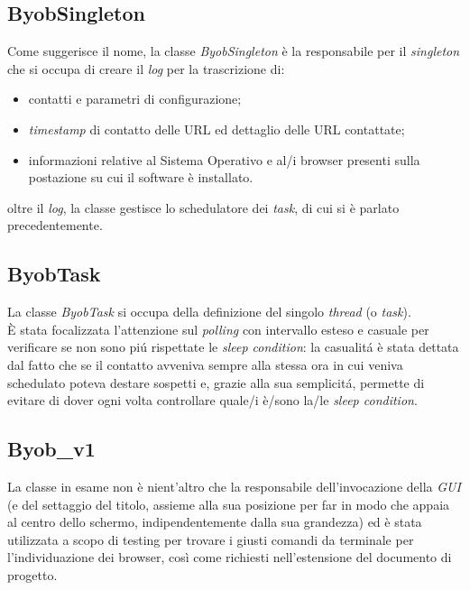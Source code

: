 \vspace*{0.5cm}
\subsection{ByobSingleton}
Come suggerisce il nome, la classe \textit{ByobSingleton} \`e la responsabile per il \textit{singleton} che si occupa di creare il \textit{log} per la trascrizione di:
\begin{itemize}
\item contatti e parametri di configurazione;
\item \textit{timestamp} di contatto delle URL ed dettaglio delle URL contattate;
\item informazioni relative al Sistema Operativo e al/i browser presenti sulla postazione su cui il software \`e installato.
\end{itemize}
oltre il \textit{log}, la classe gestisce lo schedulatore dei \textit{task}, di cui si \`e parlato precedentemente.

\vspace*{0.5cm}
\subsection{ByobTask}
La classe \textit{ByobTask} si occupa della definizione del singolo \textit{thread} (o \textit{task}).\\
\`E stata focalizzata l'attenzione sul \textit{polling} con intervallo esteso e casuale per verificare se non sono pi\'u rispettate le \textit{sleep condition}: la casualit\'a \`e stata dettata dal fatto che se il contatto avveniva sempre alla stessa ora in cui veniva schedulato poteva destare sospetti e, grazie alla sua semplicit\'a, permette di evitare di dover ogni volta controllare quale/i \`e/sono la/le \textit{sleep condition}.

\vspace*{0.5cm}
\subsection{Byob\_v1}
La classe in esame non \`e nient'altro che la responsabile dell'invocazione della \textit{GUI} (e del settaggio del titolo, assieme alla sua posizione per far in modo che appaia al centro dello schermo, indipendentemente dalla sua grandezza) ed \`e stata utilizzata a scopo di testing per trovare i giusti comandi da terminale per l'individuazione dei browser, cos\`i come richiesti nell'estensione del documento di progetto.

